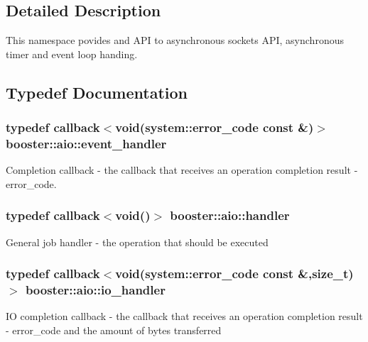 \subsection{Detailed Description}
This namespace povides and A\+PI to asynchronous sockets A\+PI, asynchronous timer and event loop handing. 

\subsection{Typedef Documentation}
\subsubsection[{event\+\_\+handler}]{\setlength{\rightskip}{0pt plus 5cm}typedef {\bf callback}$<$void({\bf system\+::error\+\_\+code} const \&)$>$ {\bf booster\+::aio\+::event\+\_\+handler}}\label{namespacebooster_1_1aio_a6f0da1262eee438aff012673690a0930}
Completion callback -\/ the callback that receives an operation completion result -\/ error\+\_\+code. 
\subsubsection[{handler}]{\setlength{\rightskip}{0pt plus 5cm}typedef {\bf callback}$<$void()$>$ {\bf booster\+::aio\+::handler}}\label{namespacebooster_1_1aio_ab53e9a02670be9c7c93a1b54cec00c97}
General job handler -\/ the operation that should be executed 
\subsubsection[{io\+\_\+handler}]{\setlength{\rightskip}{0pt plus 5cm}typedef {\bf callback}$<$void({\bf system\+::error\+\_\+code} const \&,size\+\_\+t)$>$ {\bf booster\+::aio\+::io\+\_\+handler}}\label{namespacebooster_1_1aio_ade0aeea672877a3dde3b8ce4b9ac34e5}
IO completion callback -\/ the callback that receives an operation completion result -\/ error\+\_\+code and the amount of bytes transferred 
